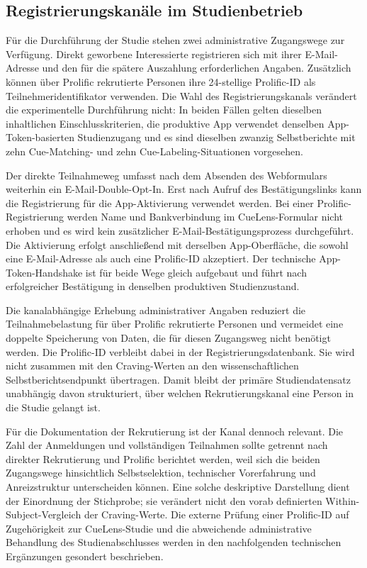 
\begin{neu}
\section{Registrierungskanäle im Studienbetrieb}

Für die Durchführung der Studie stehen zwei administrative Zugangswege zur Verfügung. Direkt geworbene Interessierte registrieren sich mit ihrer E-Mail-Adresse und den für die spätere Auszahlung erforderlichen Angaben. Zusätzlich können über Prolific rekrutierte Personen ihre 24-stellige Prolific-ID als Teilnehmeridentifikator verwenden. Die Wahl des Registrierungskanals verändert die experimentelle Durchführung nicht: In beiden Fällen gelten dieselben inhaltlichen Einschlusskriterien, die produktive App verwendet denselben App-Token-basierten Studienzugang und es sind dieselben zwanzig Selbstberichte mit zehn Cue-Matching- und zehn Cue-Labeling-Situationen vorgesehen.

Der direkte Teilnahmeweg umfasst nach dem Absenden des Webformulars weiterhin ein E-Mail-Double-Opt-In. Erst nach Aufruf des Bestätigungslinks kann die Registrierung für die App-Aktivierung verwendet werden. Bei einer Prolific-Registrierung werden Name und Bankverbindung im CueLens-Formular nicht erhoben und es wird kein zusätzlicher E-Mail-Bestätigungsprozess durchgeführt. Die Aktivierung erfolgt anschließend mit derselben App-Oberfläche, die sowohl eine E-Mail-Adresse als auch eine Prolific-ID akzeptiert. Der technische App-Token-Handshake ist für beide Wege gleich aufgebaut und führt nach erfolgreicher Bestätigung in denselben produktiven Studienzustand.

Die kanalabhängige Erhebung administrativer Angaben reduziert die Teilnahmebelastung für über Prolific rekrutierte Personen und vermeidet eine doppelte Speicherung von Daten, die für diesen Zugangsweg nicht benötigt werden. Die Prolific-ID verbleibt dabei in der Registrierungsdatenbank. Sie wird nicht zusammen mit den Craving-Werten an den wissenschaftlichen Selbstberichtsendpunkt übertragen. Damit bleibt der primäre Studiendatensatz unabhängig davon strukturiert, über welchen Rekrutierungskanal eine Person in die Studie gelangt ist.

Für die Dokumentation der Rekrutierung ist der Kanal dennoch relevant. Die Zahl der Anmeldungen und vollständigen Teilnahmen sollte getrennt nach direkter Rekrutierung und Prolific berichtet werden, weil sich die beiden Zugangswege hinsichtlich Selbstselektion, technischer Vorerfahrung und Anreizstruktur unterscheiden können. Eine solche deskriptive Darstellung dient der Einordnung der Stichprobe; sie verändert nicht den vorab definierten Within-Subject-Vergleich der Craving-Werte. Die externe Prüfung einer Prolific-ID auf Zugehörigkeit zur CueLens-Studie und die abweichende administrative Behandlung des Studienabschlusses werden in den nachfolgenden technischen Ergänzungen gesondert beschrieben.
\end{neu}
